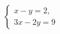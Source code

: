 \begin{ex}
	\begin{condition}
		\( \left\{
		\begin{array}{l}
			x-y=2,\\
			3x-2y=9
		\end{array}
		\right. \)
	\end{condition}
\end{ex}